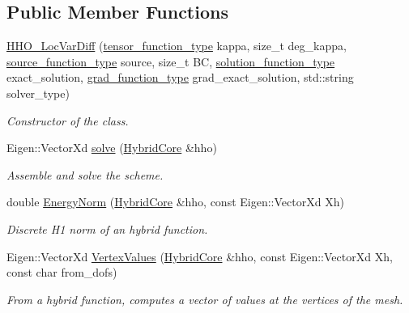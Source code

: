 \subsection*{Public Member Functions}
\begin{DoxyCompactItemize}
\item 
\hyperlink{group__HHO__LocVarDiff_ga5f2ab34d1e5afb3d83b548a1cb09f83a}{H\+H\+O\+\_\+\+Loc\+Var\+Diff} (\hyperlink{classHArDCore2D_1_1HHO__LocVarDiff_a15bd0c2320b456efcc07c11842c13492}{tensor\+\_\+function\+\_\+type} kappa, size\+\_\+t deg\+\_\+kappa, \hyperlink{classHArDCore2D_1_1HHO__LocVarDiff_a0bd07aa3ccc1aa9dd3c9573a5ab1c7dd}{source\+\_\+function\+\_\+type} source, size\+\_\+t BC, \hyperlink{classHArDCore2D_1_1HHO__LocVarDiff_a8bb87b6170b8a77e14d343bf76cac3d6}{solution\+\_\+function\+\_\+type} exact\+\_\+solution, \hyperlink{classHArDCore2D_1_1HHO__LocVarDiff_a00b073818ecee542bb74860b1c204d49}{grad\+\_\+function\+\_\+type} grad\+\_\+exact\+\_\+solution, std\+::string solver\+\_\+type)
\begin{DoxyCompactList}\small\item\em Constructor of the class. \end{DoxyCompactList}\item 
Eigen\+::\+Vector\+Xd \hyperlink{group__HHO__LocVarDiff_ga74eac0904256440c429fb9502112a867}{solve} (\hyperlink{classHArDCore2D_1_1HybridCore}{Hybrid\+Core} \&hho)
\begin{DoxyCompactList}\small\item\em Assemble and solve the scheme. \end{DoxyCompactList}\item 
double \hyperlink{group__HHO__LocVarDiff_gaf359d2047dc5b2fb8640a01c025fb860}{Energy\+Norm} (\hyperlink{classHArDCore2D_1_1HybridCore}{Hybrid\+Core} \&hho, const Eigen\+::\+Vector\+Xd Xh)
\begin{DoxyCompactList}\small\item\em Discrete H1 norm of an hybrid function. \end{DoxyCompactList}\item 
Eigen\+::\+Vector\+Xd \hyperlink{group__HHO__LocVarDiff_gade5fe2edbaf0120b9b5794e96c30e568}{Vertex\+Values} (\hyperlink{classHArDCore2D_1_1HybridCore}{Hybrid\+Core} \&hho, const Eigen\+::\+Vector\+Xd Xh, const char from\+\_\+dofs)
\begin{DoxyCompactList}\small\item\em From a hybrid function, computes a vector of values at the vertices of the mesh. \end{DoxyCompactList}\item 

\end{DoxyCompactItemize}
